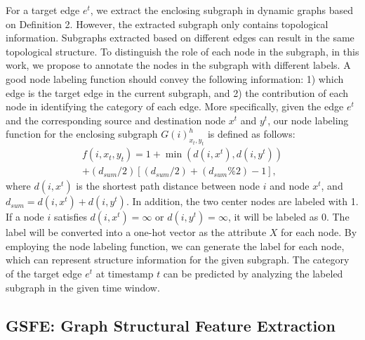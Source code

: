 \documentclass{article}
\newcommand{\zach}[1]{\textcolor{red}{(zach: #1)}}
\begin{document}

For a target edge $e^t$, we extract the enclosing subgraph in dynamic graphs based on Definition 2. %
However, the extracted subgraph only contains topological information. Subgraphs extracted based on different edges can result in the same topological structure. %
To distinguish the role of each node in the subgraph, in this work, we propose to annotate the nodes in the subgraph with different labels. %
A good node labeling function should convey the following information: 1) which edge is the target edge in the current subgraph, and 2) the contribution of each node in identifying the category of each edge. More specifically, given the edge $e^t$ and the corresponding source and destination node $x^t$ and $y^t$, our node labeling function for the enclosing subgraph $G(i)_{x_t, y_t}^h$ is defined as follows:
\begin{eqnarray} \label{eq: label}
f(i, x_t, y_t) = 1+ \min(d(i,x^t),d(i,y^t)) \\ \nonumber
+ (d_{sum} / 2)[(d_{sum}/2) + (d_{sum} \% 2) -1] ,
\end{eqnarray}
where $d(i,x^t)$ is the shortest path distance between node $i$ and node $x^t$, and $d_{sum}=d(i,x^t)+d(i,y^t)$. In addition, the two center nodes are labeled with 1. If a node $i$ satisfies $d(i,x^t)=\infty$ or $d(i,y^t)=\infty$, it will be labeled as 0. The label will be converted into a one-hot vector as the attribute $X$ for each node. By employing the node labeling function, we can generate the label for each node, which can represent structure information for the given subgraph. The category of the target edge $e^t$ at timestamp $t$ can be predicted by analyzing the labeled subgraph in the given time window.

\subsection{\textbf{GSFE}: Graph Structural Feature Extraction}
\end{document}
